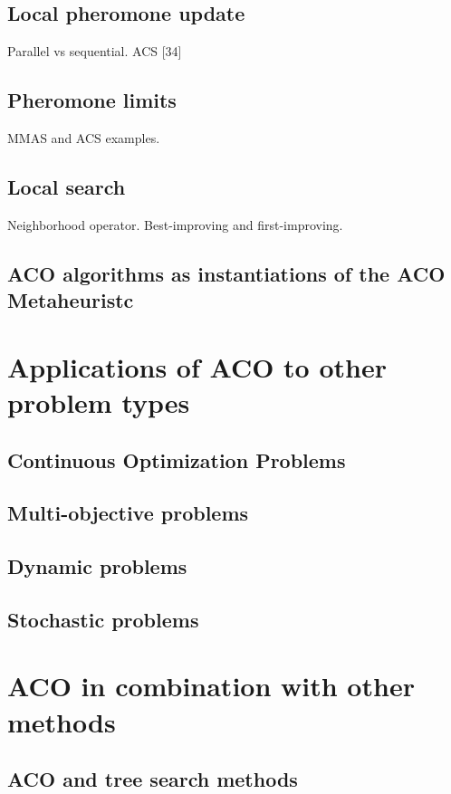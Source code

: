 \documentclass[12pt]{article}
\begin{document}
\subsection{Local pheromone update}
Parallel vs sequential.
ACS [34]

\subsection{Pheromone limits}
MMAS and ACS examples.

\subsection{Local search}
Neighborhood operator.
Best-improving and first-improving.

\subsection{ACO algorithms as instantiations of the ACO Metaheuristc}

\section{Applications of ACO to other problem types}

\subsection{Continuous Optimization Problems}

\subsection{Multi-objective problems}

\subsection{Dynamic problems}

\subsection{Stochastic problems}

\section{ACO in combination with other methods}

\subsection{ACO and tree search methods}
\end{document}
